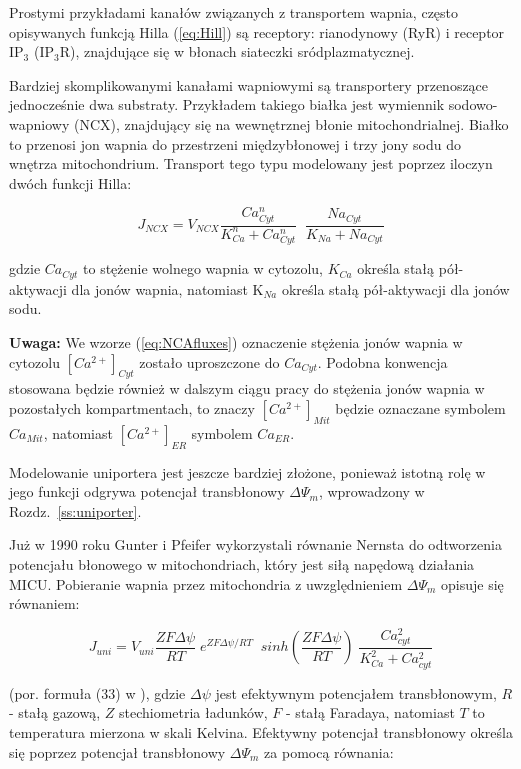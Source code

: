 Prostymi przykładami kanałów związanych z transportem wapnia, często opisywanych funkcją Hilla
(\ref{eq:Hill}) są receptory: rianodynowy (RyR) i receptor IP$_3$ (IP$_3$R), znajdujące się w błonach siateczki sródplazmatycznej.

Bardziej skomplikowanymi kanałami wapniowymi są transportery przenoszące jednocześnie dwa substraty. Przykładem takiego białka jest wymiennik sodowo-wapniowy (NCX), znajdujący się na  wewnętrznej błonie mitochondrialnej. Białko to przenosi jon wapnia do przestrzeni międzybłonowej i trzy jony sodu do wnętrza mitochondrium. Transport tego typu modelowany jest poprzez iloczyn dwóch funkcji Hilla:

\begin{equation} \label{eq:NCAfluxes}
J_{NCX} = V_{NCX} \frac{Ca_{Cyt}^{n}}{K_{Ca}^{n} + Ca_{Cyt}^{n}}\;\;\frac{Na_{Cyt}}{K_{Na} + Na_{Cyt}}
\end{equation}

\noindent gdzie $Ca_{Cyt}$ to stężenie wolnego wapnia w cytozolu, $K_{Ca}$ określa stałą pół-aktywacji dla jonów wapnia, natomiast K$_{Na}$ określa stałą pół-aktywacji dla jonów sodu.

\bigskip

\noindent \textbf{Uwaga:}
We wzorze (\ref{eq:NCAfluxes}) oznaczenie stężenia jonów wapnia w cytozolu  $[Ca^{2+}]_{Cyt}$  zostało uproszczone do $Ca_{Cyt}$. Podobna konwencja stosowana będzie również w dalszym ciągu pracy do stężenia jonów wapnia w pozostałych kompartmentach, to znaczy $[Ca^{2+}]_{Mit}$ będzie oznaczane symbolem $Ca_{Mit}$, natomiast $[Ca^{2+}]_{ER}$ symbolem $Ca_{ER}$.

\bigskip

Modelowanie uniportera jest jeszcze bardziej złożone, ponieważ istotną rolę w jego funkcji odgrywa potencjał transbłonowy $\Delta\Psi_m$, wprowadzony w Rozdz.~\ref{ss:uniporter}.

\noindent Już w 1990 roku Gunter i Pfeifer \cite{Gunter1990} wykorzystali równanie Nernsta  do odtworzenia potencjału błonowego w mitochondriach, który jest siłą napędową działania MICU. Pobieranie wapnia przez mitochondria z uwzględnieniem  $\Delta\Psi_m$ opisuje się równaniem:

\begin{equation}
J_{uni}=V_{uni} \frac{ZF\Delta\psi}{RT}\;e^{ZF\Delta\psi/RT}\;\;sinh\left(\frac{ZF\Delta\psi}{RT}\right)\;\frac{Ca_{cyt}^2}{K^{2}_{Ca} + Ca_{cyt}^2}
\end{equation}

\noindent (por. formuła (33) w \cite{Falcke2004}), gdzie $\Delta\psi$ jest efektywnym potencjałem transbłonowym, $R$ - stałą gazową, $Z$ stechiometria ładunków, $F$ - stałą Faradaya, natomiast $T$ to temperatura mierzona w skali Kelvina.
Efektywny potencjał transbłonowy określa się poprzez
potencjał transbłonowy $\Delta\Psi_m$
za pomocą równania:

